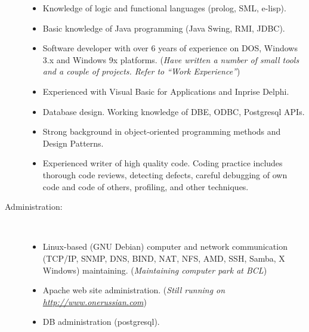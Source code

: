 \documentclass[10pt,overlapped,line]{res}
\newcommand{\wdescription}[1]{({\small \textit{#1}})}
\begin{document}
\begin{resume}
\begin{description}
\begin{itemize}
      \item Knowledge of logic and functional languages (prolog, SML, e-lisp).

      \item Basic knowledge of Java programming (Java Swing, RMI,
        JDBC).

      \item Software developer with over 6 years of experience on DOS,
        Windows 3.x and Windows 9x platforms.
        \wdescription{Have written a number of small tools and a couple of
          projects. Refer to ``Work Experience''}

      \item Experienced with Visual Basic for Applications and Inprise
        Delphi.

      \item Database design. Working knowledge of DBE, ODBC, Postgresql
        APIs.

      \item Strong background in object-oriented programming methods
        and Design Patterns.

      \item Experienced writer of high quality code. Coding practice
        includes thorough code reviews, detecting defects, careful
        debugging of own code and code of others, profiling, and other
        techniques.
      \end{itemize}

    \item[Administration:] \hspace*{\fill} \\
      \begin{itemize}
      \item Linux-based (GNU Debian) computer and network communication (TCP/IP,
        SNMP, DNS, BIND, NAT, NFS, AMD, SSH, Samba, X Windows) maintaining.
        \wdescription{Maintaining computer park at BCL}
      \item Apache web site administration.
        \wdescription{Still running on \href{URL}{http://www.onerussian.com}}
      \item DB administration (postgresql).
      \end{itemize}


\end{description}
\end{resume}
\end{document}
